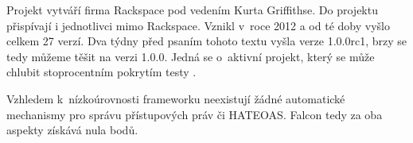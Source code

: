 Projekt vytváří firma Rackspace pod vedením Kurta Griffithse. Do projektu přispívají i jednotlivci mimo Rackspace. Vznikl v~roce 2012 a od té doby vyšlo celkem 27 verzí. Dva týdny před psaním tohoto textu vyšla verze 1.0.0rc1, brzy se tedy můžeme těšit na verzi 1.0.0. Jedná se o~aktivní projekt, který se může chlubit stoprocentním pokrytím testy \autocite{falconcoverage}.

Vzhledem k~nízkoúrovnosti frameworku neexistují žádné automatické mechanismy pro správu přístupových práv či HATEOAS. Falcon tedy za oba aspekty získává nula bodů.
